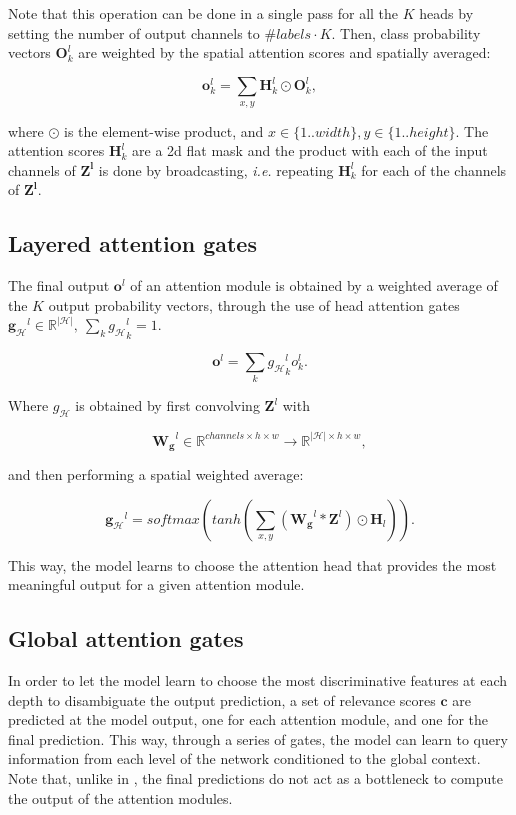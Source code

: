 \documentclass[runningheads]{llncs}
\begin{document}
Note that this operation can be done in a single pass for all the $K$ heads by setting the number of output channels to $\#labels \cdot K$. Then, class probability vectors $\mathbf{O}_k^l$ are weighted by the spatial attention scores and spatially averaged:

\begin{equation}
\mathbf{o}^l_k = \sum_{x,y} \mathbf{H}^l_k \odot \mathbf{O}^l_k,
\label{eq:atthead2}
\end{equation}

where $\odot$ is the element-wise product, and $x\in \{1..width\}, y\in\{1..height\}$. The attention scores $\mathbf{H}^l_k$ are a 2d flat mask and the product with each of the input channels of $\mathbf{Z^l}$ is done by broadcasting, \emph{i.e.} repeating $\mathbf{H}^l_k$ for each of the channels  of $\mathbf{Z^l}$.

\subsection{Layered attention gates}

The final output $\mathbf{o}^l$ of an attention module is obtained by a weighted average of the $K$ output probability vectors, through the use of head attention gates ${\mathbf{g}_\mathcal{H}}^l \in \mathbb{R}^{|\mathcal{H}|},\ \sum_k {g_\mathcal{H}}^l_k = 1$.

\begin{equation}
\mathbf{o}^l = \sum_k {g_\mathcal{H}}^l_k o^l_k.
\end{equation}

Where $g_\mathcal{H}$ is obtained by first convolving $\mathbf{Z}^l$ with

$$
\mathbf{W_g}^l \in \mathbb{R}^{channels \times h\times w} \rightarrow \mathbb{R}^{|\mathcal{H}| \times h \times w},
$$

and then performing a spatial weighted average:

\begin{equation}
\mathbf{g_\mathcal{H}}^l = softmax(tanh(\sum_{x,y} (\mathbf{W_g}^l \ast \mathbf{Z}^l ) \odot \mathbf{H}_l)).
\end{equation}

This way, the model learns to choose the attention head that provides the most meaningful output for a given attention module.

\subsection{Global attention gates}
In order to let the model learn to choose the most discriminative features at each depth to disambiguate the output prediction, a set of relevance scores $\mathbf{c}$  are predicted at the model output, one for each attention module, and one for the final prediction. This way, through a series of gates, the model can learn to query information from each level of the network conditioned to the global context. Note that, unlike in \cite{jetley2018learn}, the final predictions do not act as a bottleneck to compute the output of the attention modules.
\end{document}
